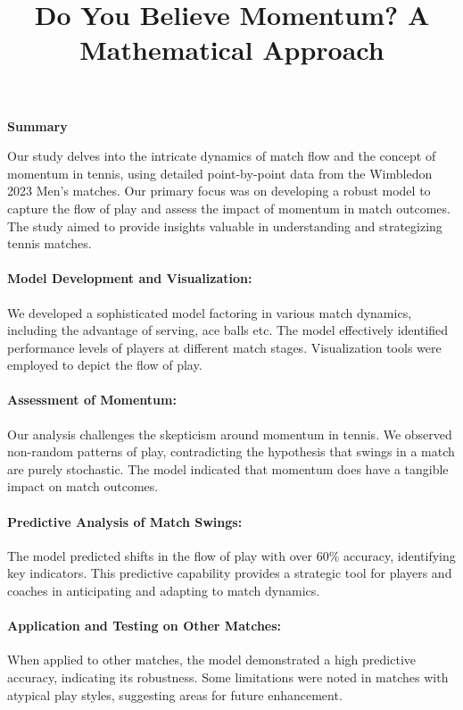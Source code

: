 \documentclass[UTF8]{mcmthesis}
\title{\bfseries Do You Believe Momentum? A Mathematical Approach}  %
\begin{document}
    \begin{summary}
    \begin{center}
        \textbf{Summary}
    \end{center}
	Our study delves into the intricate dynamics of match flow and the concept of momentum in tennis, using detailed point-by-point data from the Wimbledon 2023 Men's matches. Our primary focus was on developing a robust model to capture the flow of play and assess the impact of momentum in match outcomes. The study aimed to provide insights valuable in understanding and strategizing tennis matches. 
	
	\paragraph{Model Development and Visualization:}
	We developed a sophisticated model factoring in various match dynamics, including the advantage of serving, ace balls etc. The model effectively identified performance levels of players at different match stages. Visualization tools were employed to depict the flow of play.
	
	\paragraph{Assessment of Momentum:}
	Our analysis challenges the skepticism around momentum in tennis. We observed non-random patterns of play, contradicting the hypothesis that swings in a match are purely stochastic. The model indicated that momentum does have a tangible impact on match outcomes. 
	
	\paragraph{Predictive Analysis of Match Swings:}
	The model predicted shifts in the flow of play with over $60\%$ accuracy, identifying key indicators. This predictive capability provides a strategic tool for players and coaches in anticipating and adapting to match dynamics.
	
	\paragraph{Application and Testing on Other Matches:}
	When applied to other matches, the model demonstrated a high predictive accuracy, indicating its robustness. Some limitations were noted in matches with atypical play styles, suggesting areas for future enhancement.
	

\end{summary}
\end{document}
